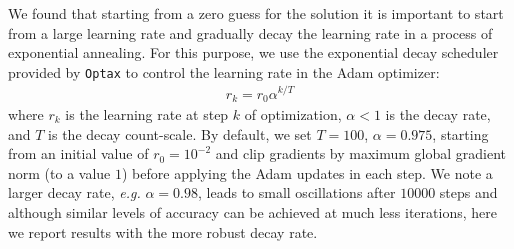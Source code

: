 \documentclass{elsarticle}
\begin{document}

We found that starting from a zero guess for the solution it is important to start from a large learning rate and gradually decay the learning rate in a process of exponential annealing. For this purpose, we use the exponential decay scheduler provided by \texttt{Optax} \cite{optax2020github} to control the learning rate in the Adam \cite{kingma2014adam} optimizer:
\begin{align*}
r_{k} = r_0 \alpha^{k / T}
\end{align*}
where $r_k$ is the learning rate at step $k$ of optimization, $\alpha<1$ is the decay rate, and $T$ is the decay count-scale. By default, we set $T=100$, $\alpha=0.975$, starting from an initial value of $r_0=10^{-2}$ and clip gradients by maximum global gradient norm (to a value $1$) \cite{gradClipping} before applying the Adam updates in each step. We note a larger decay rate, \textit{e.g.} $\alpha=0.98$, leads to small oscillations after $10000$ steps and although similar levels of accuracy can be achieved at much less iterations, here we report results with the more robust decay rate. %

\end{document}
